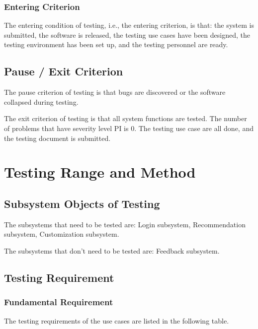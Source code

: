 \documentclass[10pt]{article}
\begin{document}
\subsubsection{Entering Criterion}
The entering condition of testing, i.e., the entering criterion, is that: the system is submitted, the software is released, the testing use cases have been designed, the testing environment has been set up, and the testing personnel are ready.

\subsection{Pause / Exit Criterion}
The pause criterion of testing is that bugs are discovered or the software collapsed during testing.

The exit criterion of testing is that all system functions are tested. The number of problems that have severity level PI is 0. The testing use case are all done, and the testing document is submitted.

\section{Testing Range and Method}
\subsection{Subsystem Objects of Testing}
The subsystems that need to be tested are: Login subsystem, Recommendation subsystem, Customization subsystem.

The subsystems that don’t need to be tested are: Feedback subsystem.

\subsection{Testing Requirement}
\subsubsection{Fundamental Requirement}
The testing requirements of the use cases are listed in the following table. 
\end{document}
